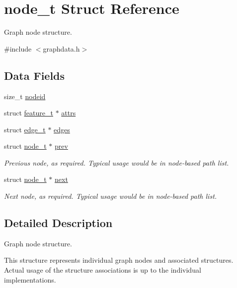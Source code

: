 \hypertarget{structnode__t}{}\section{node\+\_\+t Struct Reference}
\label{structnode__t}


Graph node structure.  




{\ttfamily \#include $<$graphdata.\+h$>$}

\subsection*{Data Fields}
\begin{DoxyCompactItemize}
\item 
size\+\_\+t \hyperlink{structnode__t_a3fe17f2fd1e7a7b2ec5f7bfae826816c}{nodeid}
\item 
struct \hyperlink{structfeature__t}{feature\+\_\+t} $\ast$ \hyperlink{structnode__t_a6d2c8715312b206eab73c385d58870e5}{attrs}
\item 
struct \hyperlink{structedge__t}{edge\+\_\+t} $\ast$ \hyperlink{structnode__t_a8d25d828a2823867dec243aee51835cb}{edges}
\item 
struct \hyperlink{structnode__t}{node\+\_\+t} $\ast$ \hyperlink{structnode__t_aed5643ccd87b35d3fb69f04903e59b95}{prev}
\begin{DoxyCompactList}\small\item\em Previous node, as required. Typical usage would be in node-\/based path list. \end{DoxyCompactList}\item 
struct \hyperlink{structnode__t}{node\+\_\+t} $\ast$ \hyperlink{structnode__t_aca548c9bafe54ba9db19d40a7a7f1cb3}{next}
\begin{DoxyCompactList}\small\item\em Next node, as required. Typical usage would be in node-\/based path list. \end{DoxyCompactList}\end{DoxyCompactItemize}


\subsection{Detailed Description}
Graph node structure. 

This structure represents individual graph nodes and associated structures. Actual usage of the structure associations is up to the individual implementations. 

